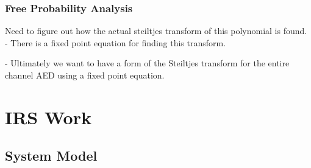 \documentclass[12pt,a4paper]{report}
\begin{document}
\subsection{Free Probability Analysis}
Need to figure out how the actual steiltjes transform of this polynomial is found.
- There is a fixed point equation for finding this transform.

- Ultimately we want to have a form of the Steiltjes transform for the entire channel AED using a fixed point equation.
\chapter{IRS Work}

\section{System Model}\label{system_model}
\end{document}
